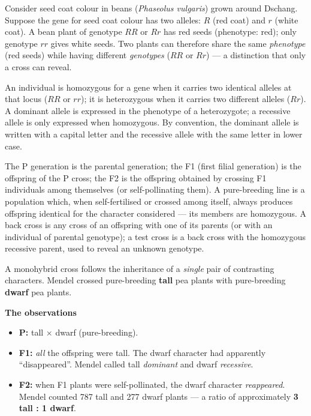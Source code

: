 \documentclass[11pt]{article}
\newcommand{\cle}[1]{{\popxbold\color{popdark}#1}}
\newcounter{popsec}
\newcounter{popsub}
\newcommand{\courssub}[1]{%
  \stepcounter{popsub}%
  \par\vspace{9pt}\noindent{\popxbold\fontsize{11.5}{13}\selectfont\color{popink}{\color{poporange}\thepopsec.\thepopsub}\hspace{6pt}#1}\par\nopagebreak\vspace{4pt}
}
\begin{document}
\begin{exemplebox}
Consider seed coat colour in beans (\emph{Phaseolus vulgaris}) grown around Dschang. Suppose the gene for seed coat colour has two alleles: $R$ (red coat) and $r$ (white coat). A bean plant of genotype $RR$ or $Rr$ has red seeds (phenotype: red); only genotype $rr$ gives white seeds. Two plants can therefore share the same \emph{phenotype} (red seeds) while having different \emph{genotypes} ($RR$ or $Rr$) --- a distinction that only a cross can reveal.
\end{exemplebox}

\begin{definition}
An individual is \cle{homozygous} for a gene when it carries two identical alleles at that locus ($RR$ or $rr$); it is \cle{heterozygous} when it carries two different alleles ($Rr$). A \cle{dominant} allele is expressed in the phenotype of a heterozygote; a \cle{recessive} allele is only expressed when homozygous. By convention, the dominant allele is written with a capital letter and the recessive allele with the same letter in lower case.
\end{definition}

\begin{definition}
The \cle{P generation} is the parental generation; the \cle{F1} (first filial generation) is the offspring of the P cross; the \cle{F2} is the offspring obtained by crossing F1 individuals among themselves (or self-pollinating them). A \cle{pure-breeding line} is a population which, when self-fertilised or crossed among itself, always produces offspring identical for the character considered --- its members are homozygous. A \cle{back cross} is any cross of an offspring with one of its parents (or with an individual of parental genotype); a \cle{test cross} is a back cross with the homozygous recessive parent, used to reveal an unknown genotype.
\end{definition}

\courssub{Mendel's Monohybrid Experiments}

A \cle{monohybrid cross} follows the inheritance of a \emph{single} pair of contrasting characters. Mendel crossed pure-breeding \textbf{tall} pea plants with pure-breeding \textbf{dwarf} pea plants.

\textbf{The observations}\par
\begin{itemize}
\item \textbf{P:} tall $\times$ dwarf (pure-breeding).
\item \textbf{F1:} \emph{all} the offspring were tall. The dwarf character had apparently ``disappeared''. Mendel called tall \emph{dominant} and dwarf \emph{recessive}.
\item \textbf{F2:} when F1 plants were self-pollinated, the dwarf character \emph{reappeared}. Mendel counted 787 tall and 277 dwarf plants --- a ratio of approximately \textbf{3 tall : 1 dwarf}.
\end{itemize}
\end{document}
